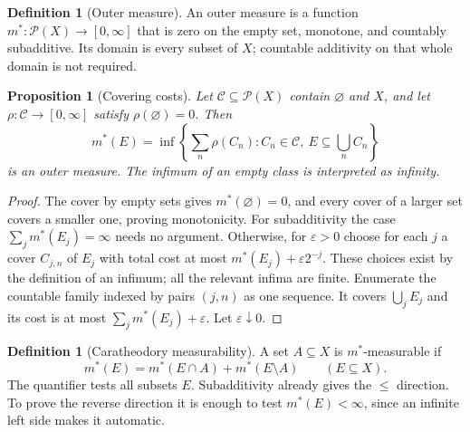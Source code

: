 \documentclass[11pt,oneside,openany]{book}
\newtheorem{proposition}[theorem]{Proposition}
\theoremstyle{definition}
\newtheorem{definition}[theorem]{Definition}
\theoremstyle{remark}
\newcommand{\eps}{\varepsilon}\newcommand{\ee}{\varepsilon}
\newcommand{\Eplus}{[0,\infty]}
\newcommand{\family}[1]{}
\begin{document}
\begin{definition}[Outer measure]
\family{D11.02.outer_measure}\label{d11:02:outer-measure}
An outer measure is a function $m^*:\mathcal P(X)\to\Eplus$ that is zero
on the empty set, monotone, and countably subadditive. Its domain is every
subset of $X$; countable additivity on that whole domain is not required.
\end{definition}

\begin{proposition}[Covering costs]
\family{D11.02.cover_outer_measure}\label{d11:02:cover-outer-measure}
Let $\mathcal C\subseteq\mathcal P(X)$ contain $\varnothing$ and $X$, and
let $\rho:\mathcal C\to\Eplus$ satisfy $\rho(\varnothing)=0$. Then
\[
 m^*(E)=\inf\left\{\sum_n\rho(C_n):C_n\in\mathcal C,
                  \ E\subseteq\bigcup_n C_n\right\}
\]
is an outer measure. The infimum of an empty class is interpreted as infinity.
\end{proposition}
\begin{proof}
The cover by empty sets gives $m^*(\varnothing)=0$, and every cover of a
larger set covers a smaller one, proving monotonicity. For subadditivity the
case $\sum_jm^*(E_j)=\infty$ needs no argument. Otherwise, for $\eps>0$
choose for each $j$ a cover $C_{j,n}$ of $E_j$ with total cost at most
$m^*(E_j)+\eps2^{-j}$. These choices exist by the definition of an infimum;
all the relevant infima are finite. Enumerate the countable family indexed
by pairs $(j,n)$ as one sequence. It covers $\bigcup_jE_j$ and its cost is
at most $\sum_jm^*(E_j)+\eps$. Let $\eps\downarrow0$.
\end{proof}

\begin{definition}[Caratheodory measurability]
\family{D11.02.caratheodory_measurable}\label{d11:02:caratheodory-measurable}
A set $A\subseteq X$ is $m^*$-measurable if
\[
 m^*(E)=m^*(E\cap A)+m^*(E\setminus A)\qquad(E\subseteq X).
\]
The quantifier tests all subsets $E$. Subadditivity already gives the
$\leq$ direction. To prove the reverse direction it is enough to test
$m^*(E)<\infty$, since an infinite left side makes it automatic.
\end{definition}
\end{document}
